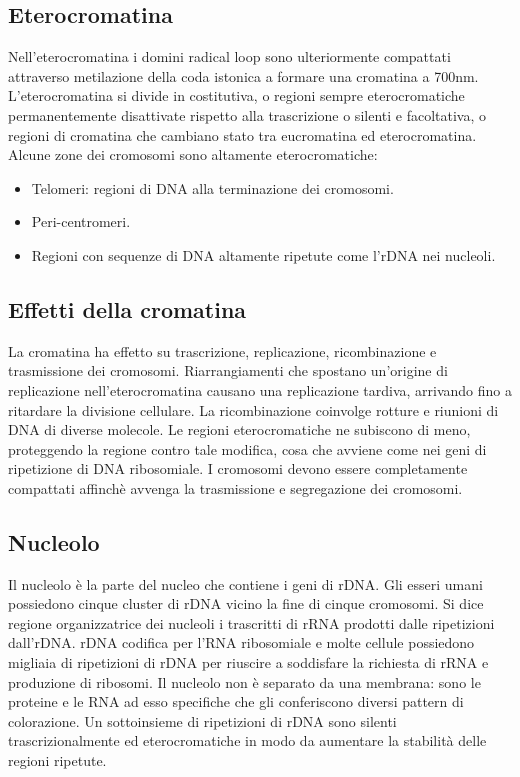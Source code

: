 \subsection{Eterocromatina}
Nell'eterocromatina i domini radical loop sono ulteriormente compattati attraverso metilazione della coda istonica a formare una cromatina a \num{700}\si{\nano\metre}. L'eterocromatina
si divide in costitutiva, o regioni sempre eterocromatiche permanentemente disattivate rispetto alla trascrizione o silenti e facoltativa, o regioni di cromatina che cambiano stato tra
eucromatina ed eterocromatina. Alcune zone dei cromosomi sono altamente eterocromatiche:
\begin{itemize}
	\item Telomeri: regioni di DNA alla terminazione dei cromosomi.
	\item Peri-centromeri.
	\item Regioni con sequenze di DNA altamente ripetute come l'rDNA nei nucleoli.
\end{itemize}
\subsection{Effetti della cromatina}
La cromatina ha effetto su trascrizione, replicazione, ricombinazione e trasmissione dei cromosomi. Riarrangiamenti che spostano un'origine di replicazione nell'eterocromatina 
causano una replicazione tardiva, arrivando fino a ritardare la divisione cellulare. La ricombinazione coinvolge rotture e riunioni di DNA di diverse molecole. Le regioni eterocromatiche
ne subiscono di meno, proteggendo la regione contro tale modifica, cosa che avviene come nei geni di ripetizione di DNA ribosomiale. I cromosomi devono essere completamente compattati
affinch\`e avvenga la trasmissione e segregazione dei cromosomi. 
\subsection{Nucleolo}
Il nucleolo \`e la parte del nucleo che contiene i geni di rDNA. Gli esseri umani possiedono cinque cluster di rDNA vicino la fine di cinque cromosomi. Si dice regione organizzatrice
dei nucleoli i trascritti di rRNA prodotti dalle ripetizioni dall'rDNA. rDNA codifica per l'RNA ribosomiale e molte cellule possiedono migliaia di ripetizioni di rDNA per riuscire
a soddisfare la richiesta di rRNA e produzione di ribosomi. Il nucleolo non \`e separato da una membrana: sono le proteine e le RNA ad esso specifiche che gli conferiscono diversi
pattern di colorazione. Un sottoinsieme di ripetizioni di rDNA sono silenti trascrizionalmente ed eterocromatiche in modo da aumentare la stabilit\`a delle regioni ripetute. 
